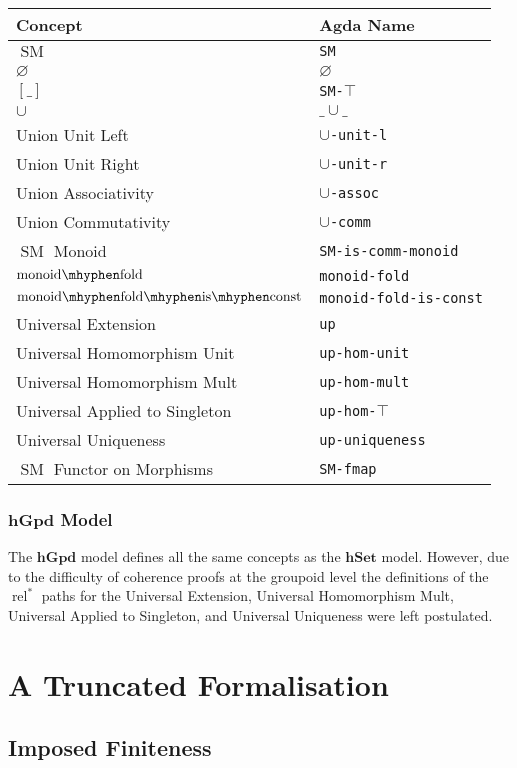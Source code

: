 \documentclass[12pt, parskip, DIV=14]{scrbook}
\newcommand{\SM}{\operatorname{SM}}
\newcommand{\hSet}{\mathbf{hSet}}
\newcommand{\hGpd}{\mathbf{hGpd}}
\newcommand{\rels}{\operatorname{rel}^*}
\newcommand{\monfold}{\operatorname{monoid\mhyphen fold}}
\newcommand{\monfoldconst}{\operatorname{monoid\mhyphen fold\mhyphen is\mhyphen const}}
\begin{document}
\begin{center}
\begin{tabular}{ll}
  Concept & Agda Name \\
  \hline
  $\SM$ & \texttt{SM} \\
  $\varnothing$ & $\varnothing$ \\
  $[\_]$ & \texttt{SM-$\top$} \\
  $\cup$ & $\_\cup\_$ \\
  Union Unit Left & \texttt{$\cup$-unit-l} \\
  Union Unit Right & \texttt{$\cup$-unit-r} \\
  Union Associativity & \texttt{$\cup$-assoc} \\
  Union Commutativity & \texttt{$\cup$-comm} \\
  $\SM$ Monoid & \texttt{SM-is-comm-monoid} \\
  $\monfold$ & \texttt{monoid-fold} \\
  $\monfoldconst$ & \texttt{monoid-fold-is-const} \\
  Universal Extension & \texttt{up} \\
  Universal Homomorphism Unit & \texttt{up-hom-unit} \\
  Universal Homomorphism Mult & \texttt{up-hom-mult} \\
  Universal Applied to Singleton & \texttt{up-hom-$\top$} \\
  Universal Uniqueness & \texttt{up-uniqueness} \\
  $\SM$ Functor on Morphisms & \texttt{SM-fmap}
\end{tabular}
\end{center}

\subsection{$\hGpd$ Model}

The $\hGpd$ model defines all the same concepts as the $\hSet$ model. However, due to the difficulty of coherence proofs at the groupoid level the definitions of the $\rels$ paths for the Universal Extension, Universal Homomorphism Mult, Universal Applied to Singleton, and Universal Uniqueness were left postulated.

\chapter{A Truncated Formalisation}

\section{Imposed Finiteness}
\end{document}
